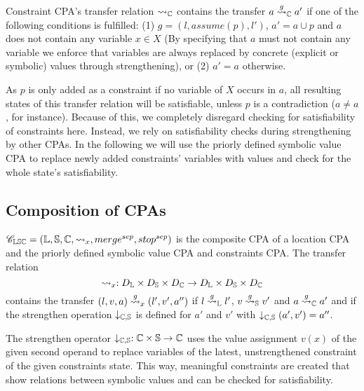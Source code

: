 Constraint CPA's transfer relation $\rightsquigarrow_{\mathbb{C}}$ contains the transfer $a \overset{g}{\rightsquigarrow}_{\mathbb{C}} a'$ if one of the following conditions is fulfilled:
(1) $g = (l, assume(p), l')$, $a' = a \cup {p}$ and $a$ does not contain any variable $x \in X$
(By specifying that $a$ must not contain any variable we enforce that variables are always replaced by concrete (explicit or symbolic) values through strengthening), or
(2) $a' = a$ otherwise.

As $p$ is only added as a constraint if no variable of $X$ occurs in $a$, all resulting states of this transfer relation will be satisfiable, unless $p$ is a contradiction ($a \neq a$, for instance). Because of this, we completely disregard checking for satisfiability of constraints here.
Instead, we rely on satisfiability checks during strengthening by other CPAs.
In the following we will use the priorly defined symbolic value CPA to replace newly added constraints' variables with values and check for the whole state's satisfiability.

\subsection{Composition of CPAs}
$\mathscr{C}_{\mathbb{L}\mathbb{S}\mathbb{C}} = (\mathbb{L}, \mathbb{S}, \mathbb{C}, \rightsquigarrow_x, merge^{sep}, stop^{sep})$ is the composite CPA of a location CPA and the priorly defined symbolic value CPA and constraints CPA.
The transfer relation \[\rightsquigarrow_x : D_{\mathbb{L}} \times D_{\mathbb{S}} \times D_{\mathbb{C}} \rightarrow D_{\mathbb{L}} \times D_{\mathbb{S}} \times D_{\mathbb{C}}\] contains
the transfer $(l, v, a) \overset{g}{\rightsquigarrow}_x (l', v', a'')$ if 
            $l \overset{g}{\rightsquigarrow}_{\mathbb{L}} l'$,
            $v \overset{g}{\rightsquigarrow}_{\mathbb{S}} v'$ and
            $a \overset{g}{\rightsquigarrow}_{\mathbb{C}} a'$ and
            if the strengthen operation $\downarrow_{\mathbb{C}, \mathbb{S}}$ is defined for $a'$ and $v'$ with
            $\downarrow_{\mathbb{C}, \mathbb{S}} (a', v') = a''$.

The strengthen operator $\downarrow_{\mathbb{C}, \mathbb{S}} : \mathbb{C} \times \mathbb{S} \rightarrow \mathbb{C}$ uses the value assignment $v(x)$ of the given second operand to replace variables of the latest, unstrengthened constraint of the given constraints state. This way, meaningful constraints are created that show relations between symbolic values and can be checked for satisfiability.

